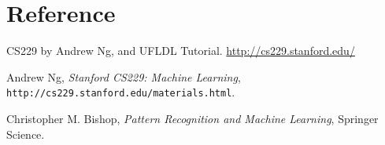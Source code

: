 %
%
%
%

\section{Reference}

CS229 by Andrew Ng, and UFLDL Tutorial. \url{http://cs229.stanford.edu/}

Andrew Ng, {\it Stanford CS229: Machine Learning}, \\ {\tt http://cs229.stanford.edu/materials.html}.

Christopher M. Bishop, {\it Pattern Recognition and Machine Learning}, Springer Science.
